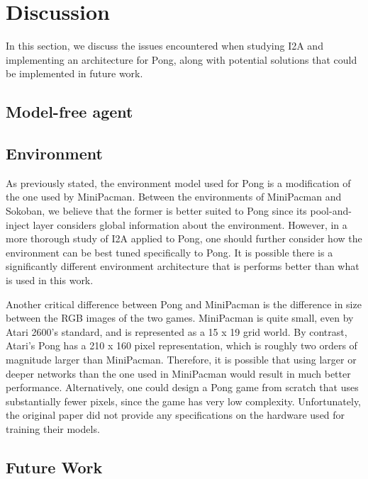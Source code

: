 \documentclass[10pt, twocolumn]{article}
\begin{document}
\section{Discussion}

In this section, we discuss the issues encountered when studying I2A and implementing an architecture for Pong, along with potential solutions that could be implemented in future work.

\subsection{Model-free agent}

\subsection{Environment}
As previously stated, the environment model used for Pong is a modification of the one used by MiniPacman. Between the environments of MiniPacman and Sokoban, we believe that the former is better suited to Pong since its pool-and-inject layer considers global information about the environment. However, in a more thorough study of I2A applied to Pong, one should further consider how the environment can be best tuned specifically to Pong. It is possible there is a significantly different environment architecture that is performs better than what is used in this work.

Another critical difference between Pong and MiniPacman is the difference in size between the RGB images of the two games. MiniPacman is quite small, even by Atari 2600's standard, and is represented as a 15 x 19 grid world. By contrast, Atari's Pong has a 210 x 160 pixel representation, which is roughly two orders of magnitude larger than MiniPacman. Therefore, it is possible that using larger or deeper networks than the one used in MiniPacman would result in much better performance. Alternatively, one could design a Pong game from scratch that uses substantially fewer pixels, since the game has very low complexity. Unfortunately, the original paper did not provide any specifications on the hardware used for training their models.

\subsection{Future Work}


{

}
\end{document}

